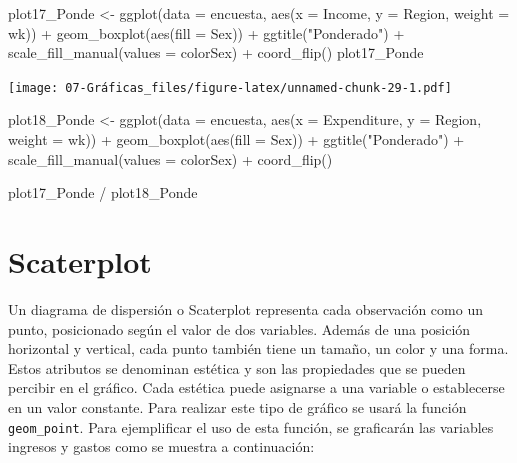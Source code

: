 \documentclass[
  12pt,
]{book}
\newenvironment{Shaded}{\begin{snugshade}}{\end{snugshade}}
\newcommand{\AttributeTok}[1]{\textcolor[rgb]{0.77,0.63,0.00}{#1}}
\newcommand{\FunctionTok}[1]{\textcolor[rgb]{0.00,0.00,0.00}{#1}}
\newcommand{\NormalTok}[1]{#1}
\newcommand{\OtherTok}[1]{\textcolor[rgb]{0.56,0.35,0.01}{#1}}
\newcommand{\SpecialCharTok}[1]{\textcolor[rgb]{0.00,0.00,0.00}{#1}}
\newcommand{\StringTok}[1]{\textcolor[rgb]{0.31,0.60,0.02}{#1}}
\begin{document}
\begin{Shaded}
\begin{Highlighting}[]
\NormalTok{plot17\_Ponde }\OtherTok{\textless{}{-}} \FunctionTok{ggplot}\NormalTok{(}\AttributeTok{data =}\NormalTok{ encuesta,}
    \FunctionTok{aes}\NormalTok{(}\AttributeTok{x =}\NormalTok{ Income, }\AttributeTok{y =}\NormalTok{ Region, }\AttributeTok{weight =}\NormalTok{ wk)) }\SpecialCharTok{+}
  \FunctionTok{geom\_boxplot}\NormalTok{(}\FunctionTok{aes}\NormalTok{(}\AttributeTok{fill =}\NormalTok{ Sex)) }\SpecialCharTok{+}
  \FunctionTok{ggtitle}\NormalTok{(}\StringTok{"Ponderado"}\NormalTok{) }\SpecialCharTok{+}
  \FunctionTok{scale\_fill\_manual}\NormalTok{(}\AttributeTok{values =}\NormalTok{ colorSex) }\SpecialCharTok{+}
  \FunctionTok{coord\_flip}\NormalTok{()}
\NormalTok{plot17\_Ponde}
\end{Highlighting}
\end{Shaded}

\texttt{[image: 07-Gráficas\_files/figure-latex/unnamed-chunk-29-1.pdf]}

\begin{Shaded}
\begin{Highlighting}[]
\NormalTok{plot18\_Ponde }\OtherTok{\textless{}{-}} \FunctionTok{ggplot}\NormalTok{(}\AttributeTok{data =}\NormalTok{ encuesta,}
    \FunctionTok{aes}\NormalTok{(}\AttributeTok{x =}\NormalTok{ Expenditure,}
        \AttributeTok{y =}\NormalTok{ Region, }\AttributeTok{weight =}\NormalTok{ wk)) }\SpecialCharTok{+}
  \FunctionTok{geom\_boxplot}\NormalTok{(}\FunctionTok{aes}\NormalTok{(}\AttributeTok{fill =}\NormalTok{ Sex)) }\SpecialCharTok{+}
  \FunctionTok{ggtitle}\NormalTok{(}\StringTok{"Ponderado"}\NormalTok{) }\SpecialCharTok{+}
  \FunctionTok{scale\_fill\_manual}\NormalTok{(}\AttributeTok{values =}\NormalTok{ colorSex) }\SpecialCharTok{+}
  \FunctionTok{coord\_flip}\NormalTok{()}

\NormalTok{plot17\_Ponde }\SpecialCharTok{/}\NormalTok{ plot18\_Ponde}
\end{Highlighting}
\end{Shaded}

\hypertarget{scaterplot}{%
\section{Scaterplot}\label{scaterplot}}

Un diagrama de dispersión o Scaterplot representa cada observación como un punto, posicionado según el valor de dos variables. Además de una posición horizontal y vertical, cada punto también tiene un tamaño, un color y una forma. Estos atributos se denominan estética y son las propiedades que se pueden percibir en el gráfico. Cada estética puede asignarse a una variable o establecerse en un valor constante. Para realizar este tipo de gráfico se usará la función \texttt{geom\_point}. Para ejemplificar el uso de esta función, se graficarán las variables ingresos y gastos como se muestra a continuación:
\end{document}

